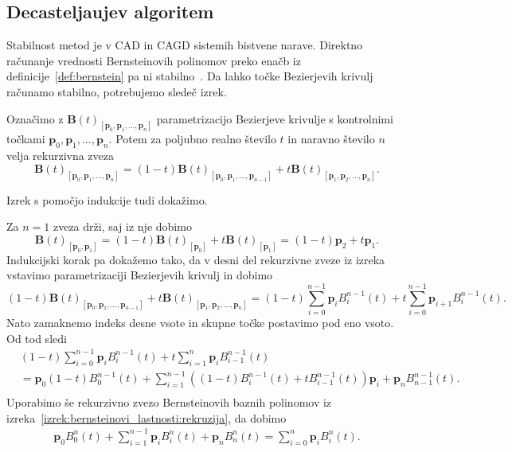 \documentclass[isrm2, tisk]{fmfdelo}
\newcommand{\p}{\mathbf{p}}
\newcommand{\lilb}[2]{B_{#1}^{#2}(t)}
\newcommand{\bigbbt}{\textbf{B}(t)}
\newcommand{\bernsteinsump}[2]{\sum_{#1=0}^{#2} \p_{#1}\lilb{#1}{#2}}
\begin{document}
    \subsection{Decasteljaujev algoritem}
    Stabilnost metod je v CAD in CAGD sistemih bistvene narave.
    Direktno računanje vrednosti Bernsteinovih polinomov preko enačb iz definicije~\ref{def:bernstein} pa ni stabilno~\cite{placeholder}.
    Da lahko točke Bezierjevih krivulj računamo stabilno, potrebujemo sledeč izrek.
    \begin{izrek}
        \label{izrek:decastelaju-rekurzija}
        Označimo z $\bigbbt_{[\p_0,\p_1,\dots,\p_n]}$ parametrizacijo Bezierjeve krivulje s kontrolnimi točkami $\p_0,\p_1,\dots,\p_n$.
        Potem za poljubno realno število $t$ in naravno število $n$ velja rekurzivna zveza \[\bigbbt_{[\p_0,\p_1,\dots,\p_n]} = (1-t)\bigbbt_{[\p_0,\p_1,\dots,\p_{n-1}]} +t\bigbbt_{[\p_1,\p_2,\dots,\p_n]}.\]
    \end{izrek}
    Izrek s pomočjo indukcije tudi dokažimo.
    \begin{dokaz}
        Za $n=1$ zveza drži, saj iz nje dobimo  \[\bigbbt_{[\p_0,\p_1]} = (1-t)\bigbbt_{[\p_0]} +t\bigbbt_{[\p_1]} = (1-t)\p_2 +t\p_1.\]
        Indukcijski korak pa dokažemo tako, da v desni del rekurzivne zveze iz izreka vstavimo parametrizaciji Bezierjevih krivulj in dobimo
        \[ (1-t) \bigbbt_{[\p_0,\p_1,\dots,\p_{n-1}]}+t\bigbbt_{[\p_1,\p_2,\dots,\p_n]} = (1-t)\bernsteinsump{i}{n-1}+t\sum_{i=0}^{n-1} \p_{i+1}B_i^{n-1}(t).\]
        Nato zamaknemo indeks desne vsote in skupne točke postavimo pod eno vsoto.
        Od tod sledi
        \begin{align*}
            &(1-t)\bernsteinsump{i}{n-1}+ t\sum_{i=1}^{n} \p_{i}B_{i-1}^{n-1}(t) \\
            &= \p_0(1-t)B_{0}^{n-1}(t) + \sum_{i=1}^{n-1}\left((1-t)B_i^{n-1}(t) + tB_{i-1}^{n-1}(t)\right)\p_{i} + \p_n B_{n-1}^{n-1}(t). \\
        \end{align*}
        Uporabimo še rekurzivno zvezo Bernsteinovih baznih polinomov iz izreka~\ref{izrek:bernsteinovi_lastnosti:rekruzija}, da dobimo
        \begin{align*}
            \p_0B_{0}^{n}(t) + \sum_{i=1}^{n-1}\p_{i}B_i^n(t) + \p_n B_{n}^{n}(t) = \sum_{i=0}^{n}\p_{i}B_i^n(t).
        \end{align*}
    \end{dokaz}
\end{document}
